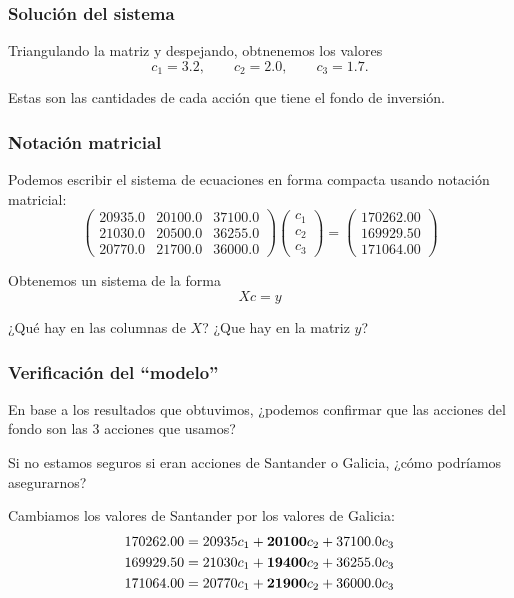 \documentclass[aspectratio=169,12pt]{beamer}
\begin{document}

\begin{frame}
\frametitle{Solución del sistema}

Triangulando la matriz y despejando, obtnenemos los valores
$$
c_1 = 3.2, \quad \quad c_2 =  2.0, \quad \quad c_3 = 1.7.
$$

Estas son las cantidades de cada acción que tiene el fondo de inversión.

\end{frame}


\begin{frame}
\frametitle{Notación matricial}

Podemos escribir el sistema de ecuaciones
en forma compacta usando notación matricial:
$$
\begin{pmatrix}
20935.0	& 20100.0 & 37100.0 \\
21030.0	& 20500.0 & 36255.0 \\
20770.0	& 21700.0 & 36000.0
\end{pmatrix}
\begin{pmatrix}
c_1 \\
c_2 \\
c_3
\end{pmatrix} = 
\begin{pmatrix}
170262.00 \\
169929.50 \\
171064.00
\end{pmatrix}
$$

Obtenemos un sistema de la forma
$$
X c = y
$$

¿Qué hay en las columnas de $X$? ¿Que hay en la matriz $y$?



\end{frame}


\begin{frame}
\frametitle{Verificación del ``modelo''}

En base a los resultados que obtuvimos, ¿podemos confirmar que las acciones del fondo son las 3 acciones que usamos?

Si no estamos seguros si eran acciones de Santander o Galicia, ¿cómo podríamos asegurarnos?

Cambiamos los valores de Santander por los valores de Galicia:
\begin{align*}
170262.00	&= 20935	c_1 + {\bf 20100} c_2 + 37100.0 c_3 \\
169929.50	&= 21030	c_1 + {\bf 19400} c_2 + 36255.0 c_3 \\
171064.00	&= 20770	c_1 + {\bf 21900} c_2 + 36000.0 c_3
\end{align*}


\end{frame}
\end{document}
